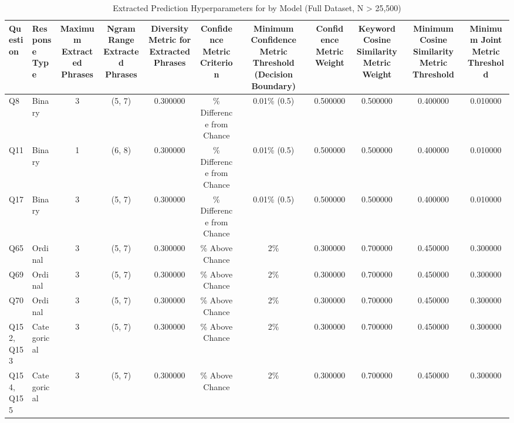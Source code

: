\begin{table}
\caption{Extracted Prediction Hyperparameters for by Model (Full Dataset, N > 25,500)}
\label{tab:pred_wvs7_hyperparams_summary}
\begin{tabular}{llccccccccc}
\toprule
Question & Response Type & Maximum Extracted Phrases & Ngram Range Extracted Phrases & Diversity Metric for Extracted Phrases & Confidence Metric Criterion & Minimum Confidence Metric Threshold (Decision Boundary) & Confidence Metric Weight & Keyword Cosine Similarity Metric Weight & Minimum Cosine Similarity Metric Threshold & Minimum Joint Metric Threshold \\
\midrule
Q8 & Binary & 3 & (5, 7) & 0.300000 & \% Difference from Chance & 0.01\% (0.5) & 0.500000 & 0.500000 & 0.400000 & 0.010000 \\
Q11 & Binary & 1 & (6, 8) & 0.300000 & \% Difference from Chance & 0.01\% (0.5) & 0.500000 & 0.500000 & 0.400000 & 0.010000 \\
Q17 & Binary & 3 & (5, 7) & 0.300000 & \% Difference from Chance & 0.01\% (0.5) & 0.500000 & 0.500000 & 0.400000 & 0.010000 \\
Q65 & Ordinal & 3 & (5, 7) & 0.300000 & \% Above Chance & 2\% & 0.300000 & 0.700000 & 0.450000 & 0.300000 \\
Q69 & Ordinal & 3 & (5, 7) & 0.300000 & \% Above Chance & 2\% & 0.300000 & 0.700000 & 0.450000 & 0.300000 \\
Q70 & Ordinal & 3 & (5, 7) & 0.300000 & \% Above Chance & 2\% & 0.300000 & 0.700000 & 0.450000 & 0.300000 \\
Q152, Q153 & Categorical & 3 & (5, 7) & 0.300000 & \% Above Chance & 2\% & 0.300000 & 0.700000 & 0.450000 & 0.300000 \\
Q154, Q155 & Categorical & 3 & (5, 7) & 0.300000 & \% Above Chance & 2\% & 0.300000 & 0.700000 & 0.450000 & 0.300000 \\
\bottomrule
\end{tabular}
\end{table}
